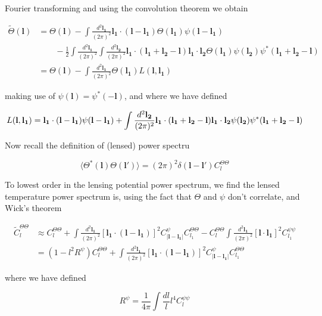 \documentclass[a4paper,10pt]{article}
\renewcommand{\v}[1]{\mathbf{#1}}
\newcommand{\half}{\frac{1}{2}}
\newcommand{\finttwo}[1]{\int \frac{d^2 \v{#1}}{(2\pi)^2}}
\begin{document}
Fourier transforming and using the convolution theorem we obtain

\begin{equation}\begin{split}
\tilde{\Theta}(\v{l}) &= \Theta(\v{l}) - \finttwo{l_1} \v{l_1}\cdot(\v{l}-\v{l_1})\Theta(\v{l_1})\psi(\v{l}-\v{l_1}) \\
& \qquad -\half \finttwo{l_1}\finttwo{l_2}\v{l_1}\cdot(\v{l_1}+\v{l_2}-\v{l})\v{l_1}\cdot\v{l_2}\Theta(\v{l_1})\psi(\v{l_2})\psi^*(\v{l_1}+\v{l_2}-\v{l})\\
&= \Theta(\v{l}) - \finttwo{l_1} \Theta(\v{l_1})L(\v{l},\v{l_1})
\label{lensedtemp}
\end{split}\end{equation}

making use of $\psi(\v{l})=\psi^*(-\v{l})$, and where we have defined 

\begin{equation}
L(\v{l},\v{l_1}) = \v{l_1}\cdot(\v{l}-\v{l_1})\psi(\v{l}-\v{l_1})+\finttwo{l_2}\v{l_1}\cdot(\v{l_1}+\v{l_2}-\v{l})\v{l_1}\cdot\v{l_2}\psi(\v{l_2})\psi^*(\v{l_1}+\v{l_2}-\v{l})\\
\end{equation}

Now recall the definition of (lensed) power spectru

\begin{equation}
\langle \Theta^*(\v{l})\Theta(\v{l}')\rangle = (2\pi)^2\delta(\v{l}-\v{l}')C_l^{\Theta\Theta}
\end{equation}

To lowest order in the lensing potential power spectrum, we find the lensed temperature power spectrum is, using the fact that $\Theta$ and $\psi$ don't correlate, and Wick's theorem

\begin{equation}\begin{split}
\tilde{C}_l^{\Theta \Theta} &\approx C_l^{\Theta \Theta}+\finttwo{l_1}[ \v{l_1}\cdot(\v{l}-\v{l_1})]^2 C^\psi_{|\v{l}-\v{l_1}|}C_{l_1}^{\Theta\Theta} - C_l^{\Theta\Theta}\finttwo{l_1} [\v{l}\cdot\v{l_1}]^2C_{l_1}^{\psi\psi}\\
&=(1-l^2R^\psi)C_l^{\Theta\Theta}+\finttwo{l_1}[ \v{l_1}\cdot(\v{l}-\v{l_1})]^2 C^{\psi}_{|\v{l}-\v{l_1}|}C_{l_1}^{\Theta\Theta}
\end{split}\end{equation}

where we have defined

\begin{equation}
R^\psi = \frac{1}{4\pi}\int \frac{dl}{l} l^4 C_l^{\psi\psi}
\end{equation}
\end{document}
